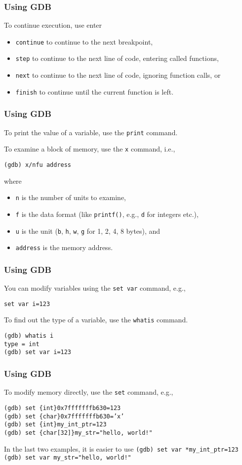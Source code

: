 \documentclass[12pt,t]{beamer}
\let\emph\relax %
\newcommand{\cmd}[1]{\begin{center}\texttt{#1}\end{center}}
\begin{document}
  \begin{frame}[fragile]
    \frametitle{Using GDB}
    
    To continue execution, use enter
    \begin{itemize}
      \item \texttt{continue} to continue to the next breakpoint,
      \item \texttt{step} to continue to the next line of code, entering called functions,
      \item \texttt{next} to continue to the next line of code, ignoring function calls, or
      \item \texttt{finish} to continue until the current function is left.
    \end{itemize}
  \end{frame}

  \begin{frame}[fragile]
    \frametitle{Using GDB}
    
    To print the value of a variable, use the \texttt{print} command.

    To examine a block of memory, use the \texttt{x} command, i.e.,
    \cmd{(gdb) x/nfu address}
    where
    \begin{itemize}
      \item \texttt{n} is the number of units to examine,
      \item \texttt{f} is the data format (like \texttt{printf()}, e.g., \texttt{d} for integers etc.),
      \item \texttt{u} is the unit (\texttt{b}, \texttt{h}, \texttt{w}, \texttt{g} for 1, 2, 4, 8 bytes), and
      \item \texttt{address} is the memory address.
    \end{itemize}
  \end{frame}

  \begin{frame}[fragile]
    \frametitle{Using GDB}
    
    You can modify variables using the \texttt{set var} command, e.g.,
    \cmd{set var i=123}

    To find out the type of a variable, use the \texttt{whatis} command.

    \texttt{(gdb) whatis i\\type = int\\(gdb) set var i=123}
  \end{frame}

  \begin{frame}[fragile]
    \frametitle{Using GDB}
    
    To modify memory directly, use the \texttt{set} command, e.g.,

    \texttt{(gdb) set \{int\}0x7fffffffb630=123\\(gdb) set \{char\}0x7fffffffb630='x'\\(gdb) set \{int\}my\_int\_ptr=123\\(gdb) set \{char[32]\}my\_str="hello, world!"}

    \emph{Note:} In the last two examples, it is easier to use
    \texttt{(gdb) set var *my\_int\_ptr=123\\(gdb) set var my\_str="hello, world!"}
  \end{frame}
\end{document}
